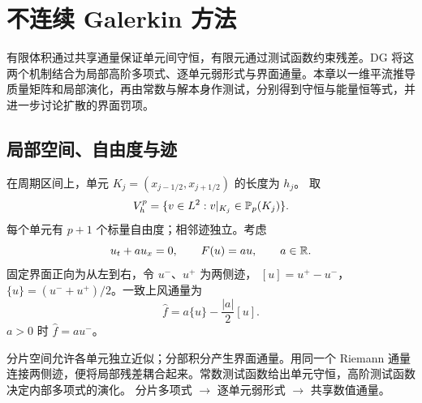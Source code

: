\chapter{不连续 Galerkin 方法}\label{ch:10}
\begin{chaptersummary}
有限体积通过共享通量保证单元间守恒，有限元通过测试函数约束残差。DG 将这两个机制结合为局部高阶多项式、逐单元弱形式与界面通量。本章以一维平流推导质量矩阵和局部演化，再由常数与解本身作测试，分别得到守恒与能量恒等式，并进一步讨论扩散的界面罚项。
\end{chaptersummary}

\section{局部空间、自由度与迹}
在周期区间上，单元 $K_j=(x_{j-1/2},x_{j+1/2})$ 的长度为 $h_j$。
取
\[
V_h^p=\{v\in L^2:v|_{K_j}\in\mathbb P_p(K_j)\}.
\]
每个单元有 $p+1$ 个标量自由度；相邻迹独立。考虑
\[
u_t+a u_x=0,\qquad F(u)=au,\qquad a\in\mathbb R.
\]
固定界面正向为从左到右，令 $u^-$、$u^+$ 为两侧迹，
$[u]=u^+-u^-$，$\{u\}=(u^-+u^+)/2$。一致上风通量为
\[
\widehat f=a\{u\}-\frac{|a|}{2}[u].
\]
$a>0$ 时 $\widehat f=au^-$。

{分片空间允许各单元独立近似；分部积分产生界面通量。用同一个 Riemann 通量连接两侧迹，便将局部残差耦合起来。常数测试函数给出单元守恒，高阶测试函数决定内部多项式的演化。}
{分片多项式 $\longrightarrow$ 逐单元弱形式 $\longrightarrow$ 共享数值通量。}

